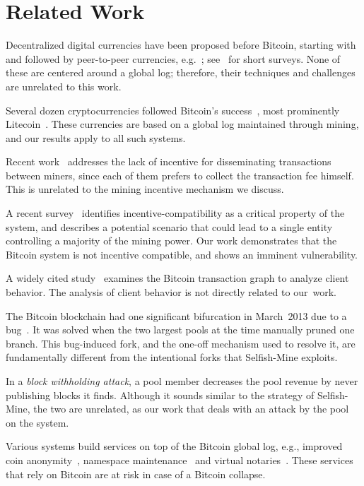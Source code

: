 \documentclass[letterpaper]{llncs}
\newcommand{\negspace}{\vspace{-0.5\baselineskip}}
\begin{document}
    \section{Related Work} \label{sec:related} 
    \negspace

Decentralized digital currencies have been proposed before Bitcoin, starting with~\cite{chaum1982blind} and followed by peer-to-peer currencies, e.g.~\cite{vishnumurthy2003karma,yang2003ppay}; see~\cite{miers2013zerocoin,barber2012bitter} for short surveys. 
None of these are centered around a global log; therefore, their techniques and challenges are unrelated to this work. 

Several dozen cryptocurrencies followed Bitcoin's success~\cite{king2012ppcoin,king2013primecoin,wiki2013list}, most prominently Litecoin~\cite{litecoin2013site}. These currencies are based on a global log maintained through mining, and our results apply to all such systems. 

Recent work~\cite{babaioff2012baloons} addresses the lack of incentive for disseminating transactions between miners, since each of them prefers to collect the transaction fee himself. This is unrelated to the mining incentive mechanism we discuss. 

A recent survey~\cite{barber2012bitter} identifies incentive-compatibility as a critical property of the system, and describes a potential scenario that could lead to a single entity controlling a majority of the mining power. 
Our work demonstrates that the Bitcoin system is not incentive compatible, and shows an imminent vulnerability.

A widely cited study~\cite{ron2013quantitative} examines the Bitcoin transaction graph to analyze client behavior. 
The analysis of client behavior is not directly related to our~work. 

The Bitcoin blockchain had one significant bifurcation in March~2013 due to a bug~\cite{gavin2013chainFork}. 
It was solved when the two largest pools at the time manually pruned one branch. 
This bug-induced fork, and the one-off mechanism used to resolve it, are fundamentally different from the intentional forks that Selfish-Mine exploits. 

In a \emph{block withholding attack}, a pool member decreases the pool revenue by never publishing blocks it finds. Although it sounds similar to the strategy of Selfish-Mine, the two are unrelated, as our work that deals with an attack by the pool on the system. 

Various systems build services on top of the Bitcoin global log, e.g., improved coin anonymity~\cite{miers2013zerocoin}, namespace maintenance~\cite{namecoin2013site} and virtual notaries~\cite{sirer2013notary,araoz2013existence}. These services that rely on Bitcoin are at risk in case of a Bitcoin collapse. 
\end{document}
